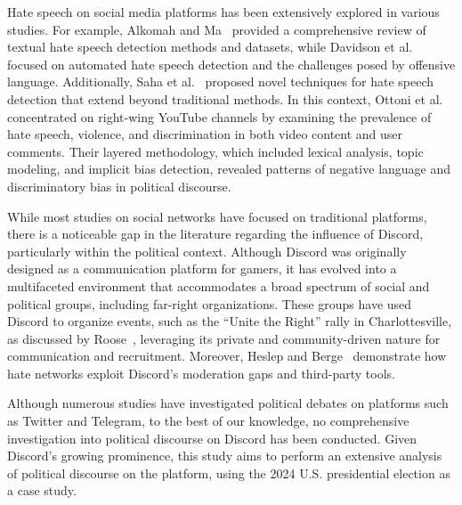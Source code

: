 Hate speech on social media platforms has been extensively explored in various studies. For example, Alkomah and Ma~\cite{hate-speech-1} provided a comprehensive review of textual hate speech detection methods and datasets, while Davidson et al.~\cite{hate-speech-3} focused on automated hate speech detection and the challenges posed by offensive language. Additionally, Saha et al.~\cite{hate-speech-2} proposed novel techniques for hate speech detection that extend beyond traditional methods. In this context, Ottoni et al.~\cite{embd-2} concentrated on right-wing YouTube channels by examining the prevalence of hate speech, violence, and discrimination in both video content and user comments. Their layered methodology, which included lexical analysis, topic modeling, and implicit bias detection, revealed patterns of negative language and discriminatory bias in political discourse.

While most studies on social networks have focused on traditional platforms, there is a noticeable gap in the literature regarding the influence of Discord, particularly within the political context. Although Discord was originally designed as a communication platform for gamers, it has evolved into a multifaceted environment that accommodates a broad spectrum of social and political groups, including far-right organizations. These groups have used Discord to organize events, such as the ``Unite the Right'' rally in Charlottesville, as discussed by Roose~\cite{roose17thiswas}, leveraging its private and community-driven nature for communication and recruitment. Moreover, Heslep and Berge~\cite{heslep2024mapping} demonstrate how hate networks exploit Discord's moderation gaps and third-party tools.

Although numerous studies have investigated political debates on platforms such as Twitter and Telegram, to the best of our knowledge, no comprehensive investigation into political discourse on Discord has been conducted. Given Discord's growing prominence, this study aims to perform an extensive analysis of political discourse on the platform, using the 2024 U.S. presidential election as a case study.



